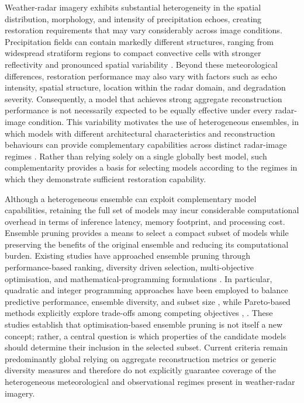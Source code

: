  Weather-radar imagery exhibits substantial heterogeneity in the spatial distribution, morphology, and intensity of precipitation echoes, creating restoration requirements that may vary considerably across image conditions. Precipitation fields can contain markedly different structures, ranging from widespread stratiform regions to compact convective cells with stronger reflectivity and pronounced spatial variability \cite{mikidadi2025application}. Beyond these meteorological differences, restoration performance may also vary with factors such as echo intensity, spatial structure, location within the radar domain, and degradation severity. Consequently, a model that achieves strong aggregate reconstruction performance is not necessarily expected to be equally effective under every radar-image condition. This variability motivates the use of heterogeneous ensembles, in which models with different architectural characteristics and reconstruction behaviours can provide complementary capabilities across distinct radar-image regimes \cite{sun2024ensir}. Rather than relying solely on a single globally best model, such complementarity provides a basis for selecting models according to the regimes in which they demonstrate sufficient restoration capability.


 Although a heterogeneous ensemble can exploit complementary model capabilities, retaining the full set of models may incur considerable computational overhead in terms of inference latency, memory footprint, and processing cost. Ensemble pruning provides a means to select a compact subset of models while preserving the benefits of the original ensemble and reducing its computational burden. Existing studies have approached ensemble pruning through performance-based ranking, diversity driven selection, multi-objective optimisation, and mathematical-programming formulations \cite{rezk2024metaheuristic}. In particular, quadratic and integer programming approaches have been employed to balance predictive performance, ensemble diversity, and subset size \cite{emine2025free}, while Pareto-based methods explicitly explore trade-offs among competing objectives \cite{he2024margin}, \cite{qiao2024ensemble}. These studies establish that optimisation-based ensemble pruning is not itself a new concept; rather, a central question is which properties of the candidate models should determine their inclusion in the selected subset. Current criteria remain predominantly global relying on aggregate reconstruction metrics or generic diversity measures and therefore do not explicitly guarantee coverage of the heterogeneous meteorological and observational regimes present in weather-radar imagery.

